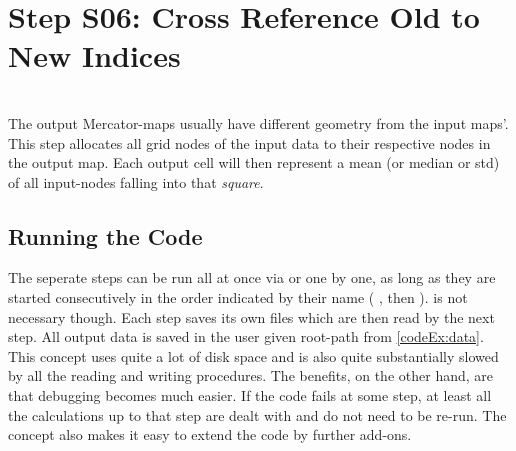 \section{Step S06: Cross Reference Old to New Indices}
\\
The output Mercator-maps usually have different geometry from the input maps'.
This step allocates all grid nodes of the input data
to their respective nodes in the output map. Each output cell will then represent a mean (or median or std) of all input-nodes falling into that \textit{square}.



\subsection{Running the Code}
The seperate steps can be run all at once via  or one by one, as
long as they are started consecutively in the order indicated by their name
( , then  \etc).  is not necessary
though. Each step saves its own files which are then read by the next step.
All output data is saved in the user given root-path from \ref{codeEx:data}.
This concept uses quite a lot of disk space and is also quite substantially
slowed by all the reading and writing procedures. The benefits, on the other
hand, are that debugging becomes much easier. If the code fails at some step,
at least all the calculations up to that step are dealt with and do not need to
be re-run. The concept also makes it easy to extend the code by further
add-ons.











